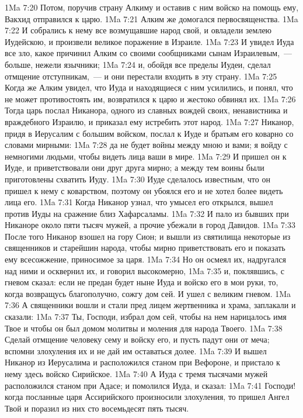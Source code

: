 \rsbpar\vs 1Ma 7:20 Потом, поручив страну Алкиму и оставив с ним войско на помощь ему, Вакхид отправился к царю.
\vs 1Ma 7:21 Алким же домогался первосвященства.
\vs 1Ma 7:22 И собрались к нему все возмущавшие народ свой, и овладели землею Иудейскою, и произвели великое поражение в Израиле.
\vs 1Ma 7:23 И увидел Иуда все зло, какое причинил Алким со своими сообщниками сынам Израилевым,~--- больше, нежели язычники;
\vs 1Ma 7:24 и, обойдя все пределы Иудеи, сделал отмщение отступникам,~--- и они перестали входить в эту страну.
\vs 1Ma 7:25 Когда же Алким увидел, что Иуда и находящиеся с ним усилились, и понял, что не может противостоять им, возвратился к царю и жестоко обвинял их.
\vs 1Ma 7:26 Тогда царь послал Никанора, одного из славных вождей своих, ненавистника и враждебного Израилю, и приказал ему истребить этот народ.
\vs 1Ma 7:27 Никанор, придя в Иерусалим с большим войском, послал к Иуде и братьям его коварно со словами мирными:
\vs 1Ma 7:28 да не будет войны между мною и вами; я войду с немногими людьми, чтобы видеть лица ваши в мире.
\vs 1Ma 7:29 И пришел он к Иуде, и приветствовали они друг друга мирно; а между тем воины были приготовлены схватить Иуду.
\vs 1Ma 7:30 Иуде сделалось известным, что он пришел к нему с коварством, поэтому он убоялся его и не хотел более видеть лица его.
\vs 1Ma 7:31 Когда Никанор узнал, что умысел его открылся, вышел против Иуды на сражение близ Хафарсаламы.
\vs 1Ma 7:32 И пало из бывших при Никаноре около пяти тысяч мужей, а прочие убежали в город Давидов.
\vs 1Ma 7:33 После того Никанор взошел на гору Сион; и вышли из святилища некоторые из священников и старейшин народа, чтобы мирно приветствовать его и показать ему всесожжение, приносимое за царя.
\vs 1Ma 7:34 Но он осмеял их, надругался над ними и осквернил их, и говорил высокомерно,
\vs 1Ma 7:35 и, поклявшись, с гневом сказал: если не предан будет ныне Иуда и войско его в мои руки, то, когда возвращусь благополучно, сожгу дом сей. И ушел с великим гневом.
\vs 1Ma 7:36 А священники вошли и стали пред лицем жертвенника и храма, заплакали и сказали:
\vs 1Ma 7:37 Ты, Господи, избрал дом сей, чтобы на нем нарицалось имя Твое и чтобы он был домом молитвы и моления для народа Твоего.
\vs 1Ma 7:38 Сделай отмщение человеку сему и войску его, и пусть падут они от меча; вспомни злохуления их и не дай им оставаться долее.
\vs 1Ma 7:39 И вышел Никанор из Иерусалима и расположился станом при Вефороне, и пристало к нему здесь войско Сирийское.
\vs 1Ma 7:40 А Иуда с тремя тысячами мужей расположился станом при Адасе; и помолился Иуда, и сказал:
\vs 1Ma 7:41 Господи! когда посланные царя Ассирийского произносили злохуления, то пришел Ангел Твой и поразил из них сто восемьдесят пять тысяч.
